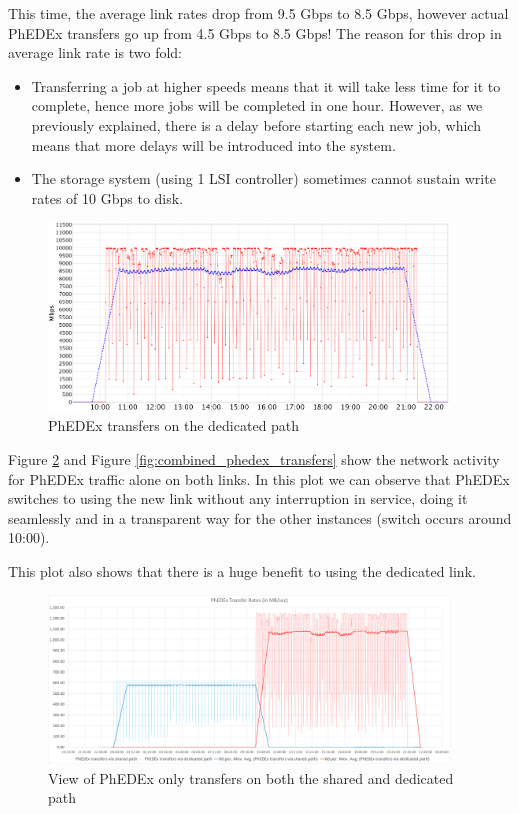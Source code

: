 This time, the average link rates drop from 9.5 Gbps to 8.5 Gbps, however 
actual PhEDEx transfers go up from 4.5 Gbps to 8.5 Gbps! The reason for this 
drop in average link rate is two fold: 

\begin{itemize}
  \item Transferring a job at higher speeds means that it will take less time for
  it to complete, hence more jobs will be completed in one hour. However, as
  we previously explained, there is a delay before starting each new job, which
  means that more delays will be introduced into the system.
  \item The storage system (using 1 LSI controller) sometimes cannot sustain
  write rates of 10 Gbps to disk.
\end{itemize}


\begin{figure}[h]
  \centering
  \includegraphics[width=0.95\textwidth]{Figures/FileDownload_Solo_path.png}
  \caption{PhEDEx transfers on the dedicated path}
    \label{fig:solo_transfers}
\end{figure} 

Figure \ref{fig:combined_transfers} and Figure \ref{fig:combined_phedex_transfers} show
the  network activity for PhEDEx traffic alone on both links. 
In this plot we can observe that PhEDEx switches to using the
new link without any interruption in service, doing it seamlessly and in a 
transparent way for the other instances (switch occurs around 10:00).

This plot also shows that there is a huge benefit to using the dedicated link.

\begin{figure}[h]
  \centering
  \includegraphics[width=0.95\textwidth]{Figures/FileDownload_All_paths.png}
  \caption{View of PhEDEx only transfers on both the shared and dedicated path}
  \label{fig:combined_transfers}
\end{figure} 

